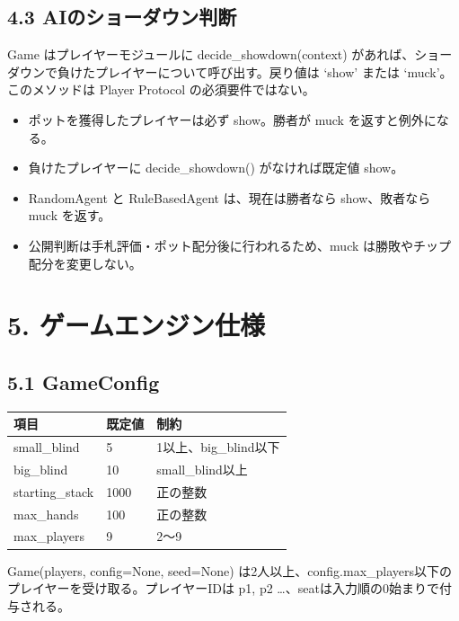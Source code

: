\documentclass[
]{article}
\begin{document}
\subsection{4.3
AIのショーダウン判断}\label{aiux306eux30b7ux30e7ux30fcux30c0ux30a6ux30f3ux5224ux65ad}

Game はプレイヤーモジュールに decide\_showdown(context)
があれば、ショーダウンで負けたプレイヤーについて呼び出す。戻り値は
`show' または `muck'。このメソッドは Player Protocol
の必須要件ではない。

\begin{itemize}
\item
  ポットを獲得したプレイヤーは必ず show。勝者が muck
  を返すと例外になる。
\item
  負けたプレイヤーに decide\_showdown() がなければ既定値 show。
\item
  RandomAgent と RuleBasedAgent は、現在は勝者なら show、敗者なら muck
  を返す。
\item
  公開判断は手札評価・ポット配分後に行われるため、muck
  は勝敗やチップ配分を変更しない。
\end{itemize}

\section{5.
ゲームエンジン仕様}\label{ux30b2ux30fcux30e0ux30a8ux30f3ux30b8ux30f3ux4ed5ux69d8}

\subsection{5.1 GameConfig}\label{gameconfig}

\begin{longtable}[]{@{}lll@{}}
\toprule\noalign{}
項目 & 既定値 & 制約 \\
\midrule\noalign{}
\endhead
\bottomrule\noalign{}
\endlastfoot
small\_blind & 5 & 1以上、big\_blind以下 \\
big\_blind & 10 & small\_blind以上 \\
starting\_stack & 1000 & 正の整数 \\
max\_hands & 100 & 正の整数 \\
max\_players & 9 & 2～9 \\
\end{longtable}

Game(players, config=None, seed=None)
は2人以上、config.max\_players以下のプレイヤーを受け取る。プレイヤーIDは
p1, p2 \ldots、seatは入力順の0始まりで付与される。
\end{document}
